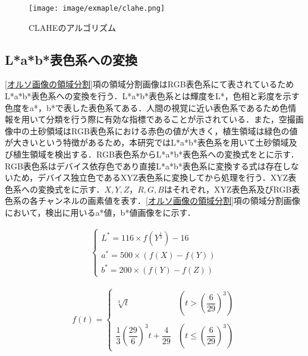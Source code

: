       \begin{figure}[t]
        \centering
        \texttt{[image: image/exmaple/clahe.png]}
        \caption{CLAHEのアルゴリズム}
        \label{CLAHEのアルゴリズム結果}
      \end{figure}


    \subsection{L*a*b*表色系への変換}
      \label{L*a*b*表色系への変換}
      \ref{オルソ画像の領域分割}項の領域分割画像はRGB表色系にて表されているためL*a*b*表色系への変換\cite{Lab表色系1}を行う．L*a*b*表色系とは輝度をL*，色相と彩度を示す色度をa*，b*で表した表色系てある．人間の視覚に近い表色系であるため色情報を用いて分類を行う際に有効な指標であることが示されている．また，空撮画像中の土砂領域はRGB表色系における赤色の値が大きく，植生領域は緑色の値が大きいという特徴があるため，本研究ではL*a*b*表色系を用いて土砂領域及び植生領域を検出する\cite{Lab表色系2, Lab表色系3, Lab表色系4}．RGB表色系からL*a*b*表色系への変換式をとに示す．RGB表色系はデバイス依存色であり直接L*a*b*表色系に変換する式は存在しないため，デバイス独立色であるXYZ表色系\cite{XYZ表色系}に変換してから処理を行う．XYZ表色系への変換式をに示す．$X,Y,Z$，$R,G,B$はそれぞれ，XYZ表色系及びRGB表色系の各チャンネルの画素値を表す．\ref{オルソ画像の領域分割}項の領域分割画像において，検出に用いるa*値，b*値画像をに示す．
      
      \begin{eqnarray}
      \label{Lab表色系1}
        \left\{
          \begin{array}{l}
            L^* = 116 \times f(Y^{\frac{1}{3}}) - 16 \\
            a^* = 500 \times (f(X) - f(Y)) \\
            b^* = 200 \times (f(Y) - f(Z))
          \end{array}
        \right.
      \end{eqnarray}

      \begin{eqnarray}
        \label{Lab表色系2}
          f(t) = 
          \left\{
            \begin{array}{lll}
              \sqrt[3]{t} 
                &(t >    (\dfrac{6} {29})^3) \\ \\
              \dfrac{1} {3} (\dfrac{29} {6})^3 t + \dfrac{4} {29}
                &(t \leq (\dfrac{6} {29})^3)
            \end{array}
          \right.
      \end{eqnarray}

